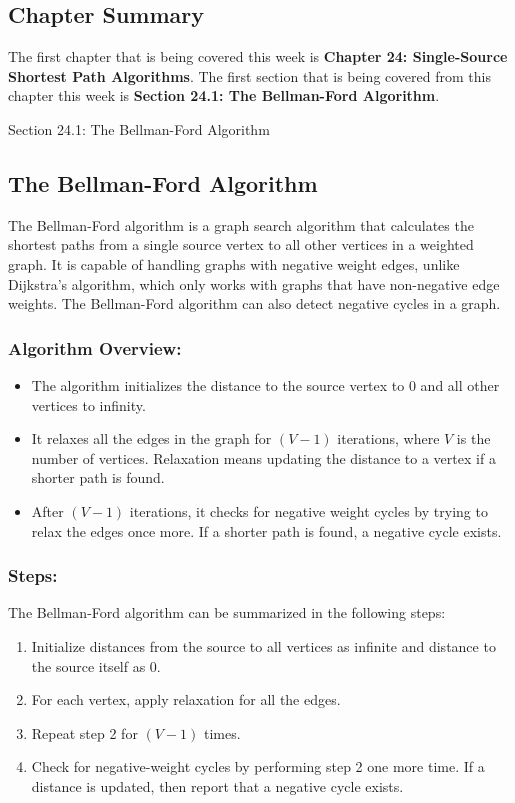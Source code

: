 \subsection{Chapter Summary}

The first chapter that is being covered this week is \textbf{Chapter 24: Single-Source Shortest Path Algorithms}. The first section that is being covered from this chapter this week is \textbf{Section 24.1: The Bellman-Ford Algorithm}.

\begin{notes}{Section 24.1: The Bellman-Ford Algorithm}
    \subsection*{The Bellman-Ford Algorithm}

    The Bellman-Ford algorithm is a graph search algorithm that calculates the shortest paths from a single source vertex to all other vertices in a weighted graph. It is capable of handling graphs 
    with negative weight edges, unlike Dijkstra's algorithm, which only works with graphs that have non-negative edge weights. The Bellman-Ford algorithm can also detect negative cycles in a graph. \vspace*{1em}
    
    \subsubsection*{Algorithm Overview:}
    
    \begin{itemize}
        \item The algorithm initializes the distance to the source vertex to 0 and all other vertices to infinity.
        \item It relaxes all the edges in the graph for $(V - 1)$ iterations, where $V$ is the number of vertices. Relaxation means updating the distance to a vertex if a shorter path is found.
        \item After $(V - 1)$ iterations, it checks for negative weight cycles by trying to relax the edges once more. If a shorter path is found, a negative cycle exists.
    \end{itemize}
    
    \subsubsection*{Steps:}
    
    The Bellman-Ford algorithm can be summarized in the following steps:
    \begin{enumerate}
        \item Initialize distances from the source to all vertices as infinite and distance to the source itself as 0.
        \item For each vertex, apply relaxation for all the edges.
        \item Repeat step 2 for $(V - 1)$ times.
        \item Check for negative-weight cycles by performing step 2 one more time. If a distance is updated, then report that a negative cycle exists.
    \end{enumerate}
    

\end{notes}
